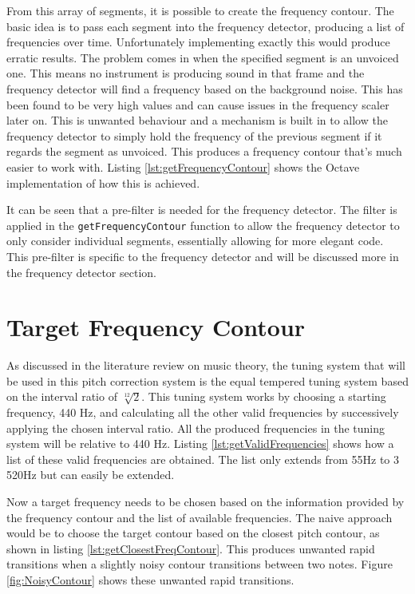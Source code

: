 
From this array of segments, it is possible to create the frequency contour. The
basic idea is to pass each segment into the frequency detector, producing a list
of frequencies over time. Unfortunately implementing exactly this would produce
erratic results. The problem comes in when the specified segment is an unvoiced
one. This means no instrument is producing sound in that frame and the frequency
detector will find a frequency based on the background noise. This has been found
to be very high values and can cause issues in the frequency scaler later on. This
is unwanted behaviour and a mechanism is built in to allow the frequency detector
to simply hold the frequency of the previous segment if it regards the segment as
unvoiced. This produces a frequency contour that's much easier to work with.
Listing \ref{lst:getFrequencyContour} shows the Octave implementation of how this
is achieved.


It can be seen that a pre-filter is needed for the frequency detector. The filter
is applied in the \colorbox{backcolour}{\lstinline{getFrequencyContour}} function
to allow the frequency detector to only consider individual segments, essentially
allowing for more elegant code. This pre-filter is specific to the frequency
detector and will be discussed more in the frequency detector section.

\section{Target Frequency Contour}

As discussed in the literature review on music theory, the tuning system that will
be used in this pitch correction system is the equal tempered tuning system based
on the interval ratio of $\sqrt[12]{2}$. This tuning system works by choosing a
starting frequency, 440 Hz, and calculating all the other valid frequencies by
successively applying the chosen interval ratio. All the produced frequencies in
the tuning system will be relative to 440 Hz. Listing
\ref{lst:getValidFrequencies} shows how a list of these valid frequencies are
obtained. The list only extends from 55Hz to 3 520Hz but can easily be extended.


Now a target frequency needs to be chosen based on the information provided by the
frequency contour and the list of available frequencies. The naive approach would
be to choose the target contour based on the closest pitch contour, as shown in
listing \ref{lst:getClosestFreqContour}. This produces unwanted rapid transitions
when a slightly noisy contour transitions between two notes. Figure
\ref{fig:NoisyContour} shows these unwanted rapid transitions.


